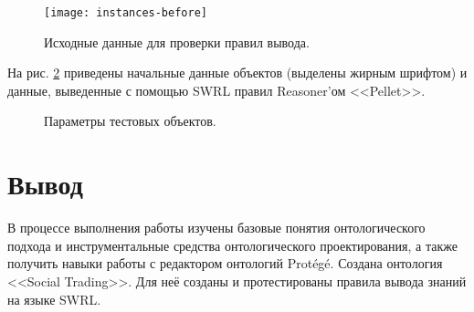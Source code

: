 		\begin{figure}[h]
			\centering
			\texttt{[image: instances-before]}
			\caption{Исходные данные для проверки правил вывода.}
			\label{fig:instances-before}
		\end{figure}
		\FloatBarrier
		
		На рис. \ref{fig:output} приведены начальные данные объектов (выделены жирным шрифтом) и данные, выведенные с помощью SWRL правил Reasoner'ом <<Pellet>>. 	
	
		\begin{figure}[ht]
			\begin{minipage}[ht]{0.49\linewidth}
			\end{minipage}
			\hfill
			\begin{minipage}[ht]{0.49\linewidth}
			\end{minipage}
			\vfill
			\begin{minipage}[ht]{0.49\linewidth}
			\end{minipage}
			\hfill
			\begin{minipage}[ht]{0.49\linewidth}
			\end{minipage}
			\vfill
			\begin{minipage}[ht]{0.49\linewidth}
			\end{minipage}
			\hfill
			\begin{minipage}[ht]{0.49\linewidth}
			\end{minipage}
			\vfill
			\vfill
			\caption{Параметры тестовых объектов.}
			\label{fig:output}  
		\end{figure}
		\FloatBarrier
	
	
		
	\section{Вывод}
		В процессе выполнения работы изучены базовые понятия онтологического подхода и инструментальные средства онтологического проектирования, а также получить навыки работы с редактором онтологий Protégé. Создана онтология <<Social Trading>>. Для неё созданы и протестированы правила вывода знаний на языке SWRL.